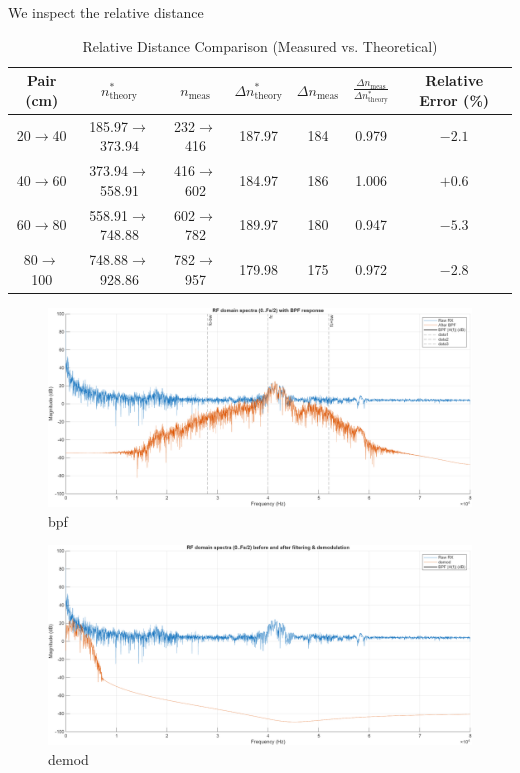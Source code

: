\documentclass[10pt]{article}
\begin{document}
We inspect the relative distance
\begin{table}[h!]
\centering
\caption{Relative Distance Comparison (Measured vs. Theoretical)}
\begin{tabular}{c|c|c|c|c|c|c}
\hline
Pair (cm) & $n^*_{\mathrm{theory}}$ & $n_{\mathrm{meas}}$ & 
$\Delta n^*_{\mathrm{theory}}$ & $\Delta n_{\mathrm{meas}}$ &
$\frac{\Delta n_{\mathrm{meas}}}{\Delta n^*_{\mathrm{theory}}}$ & 
Relative Error (\%) \\
\hline
20$\rightarrow$40 & 185.97$\rightarrow$373.94 & 232$\rightarrow$416 &
187.97 & 184 & 0.979 & $-2.1$ \\
40$\rightarrow$60 & 373.94$\rightarrow$558.91 & 416$\rightarrow$602 &
184.97 & 186 & 1.006 & $+0.6$ \\
60$\rightarrow$80 & 558.91$\rightarrow$748.88 & 602$\rightarrow$782 &
189.97 & 180 & 0.947 & $-5.3$ \\
80$\rightarrow$100 & 748.88$\rightarrow$928.86 & 782$\rightarrow$957 &
179.98 & 175 & 0.972 & $-2.8$ \\
\hline
\end{tabular}
\end{table}



\begin{figure}[!h]
	\centering 
		\includegraphics[width = .75\columnwidth]{fig/100_fdomain_bpf.png}	
	\caption{bpf}
\label{fig:bpf}
\end{figure}
\begin{figure}[!h]
	\centering 
		\includegraphics[width = .75\columnwidth]{fig/100_fdomain_demod.png}	
	\caption{demod}
\label{fig:demod}
\end{figure}
\end{document}
